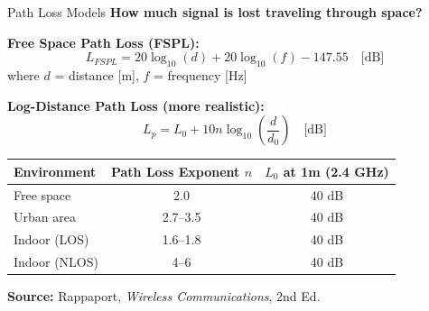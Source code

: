 \documentclass[aspectratio=169,11pt]{beamer}
\begin{document}
\begin{frame}{Path Loss Models}
    \textbf{How much signal is lost traveling through space?}
    
    \vspace{0.3cm}
    \textbf{Free Space Path Loss (FSPL):}
    \[
    L_{FSPL} = 20\log_{10}(d) + 20\log_{10}(f) - 147.55 \quad \text{[dB]}
    \]
    where $d$ = distance [m], $f$ = frequency [Hz]
    
    \vspace{0.3cm}
    \textbf{Log-Distance Path Loss (more realistic):}
    \[
    L_p = L_0 + 10n\log_{10}\left(\frac{d}{d_0}\right) \quad \text{[dB]}
    \]
    
    \begin{table}
        \centering
        \footnotesize
        \begin{tabular}{@{}lcc@{}}
            \toprule
            \textbf{Environment} & \textbf{Path Loss Exponent $n$} & \textbf{$L_0$ at 1m (2.4 GHz)} \\
            \midrule
            Free space & 2.0 & 40 dB \\
            Urban area & 2.7--3.5 & 40 dB \\
            Indoor (LOS) & 1.6--1.8 & 40 dB \\
            Indoor (NLOS) & 4--6 & 40 dB \\
            \bottomrule
        \end{tabular}
    \end{table}
    
    \textbf{Source:} Rappaport, \textit{Wireless Communications}, 2nd Ed.
\end{frame}
\end{document}
